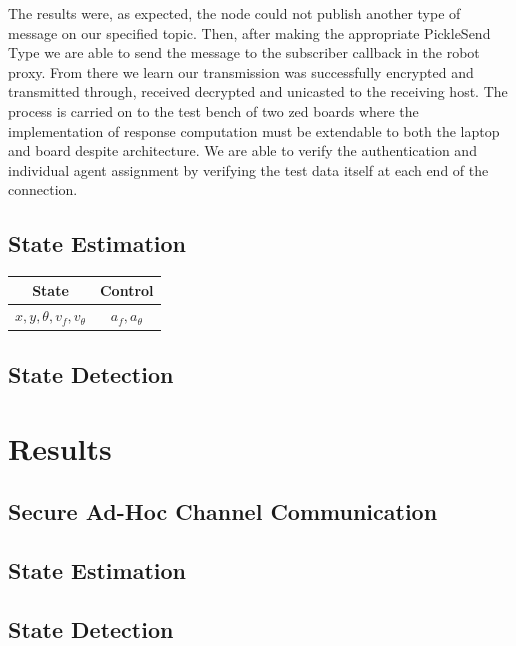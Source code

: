 \documentclass[conference]{IEEEtran}
\begin{document}
The results were, as expected, the node could not publish another type of message on our specified topic. Then, after making the appropriate PickleSend Type we are able to send the message to the subscriber callback in the robot proxy. From there we learn our transmission was successfully encrypted and transmitted through, received decrypted and unicasted to the receiving host. The process is carried on to the test bench of two zed boards where the implementation of response computation must be extendable to both the laptop and board despite architecture. We are able to verify the authentication and individual agent assignment by verifying the test data itself at each end of the connection.

\subsection{State Estimation}

\begin{table}[] \label{st_ctr_table}
\begin{center}
\begin{tabular}{|c|c|}
\hline
State & Control\\
\hline
$x,y,\theta,v_f,v_\theta$ & $a_f,a_\theta$\\
\hline
\end{tabular}
\end{center}
\end{table}

\subsection{State Detection}


\section{Results} \label{Results}
\subsection{Secure Ad-Hoc Channel Communication}



\subsection{State Estimation}



\subsection{State Detection}
\end{document}
